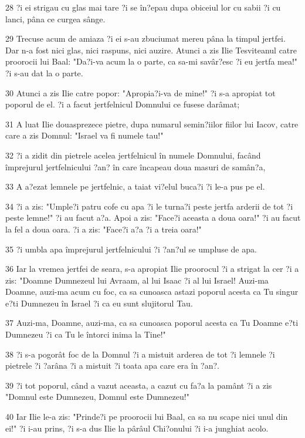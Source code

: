 \par 28 ?i ei strigau cu glas mai tare ?i se în?epau dupa obiceiul lor cu sabii ?i cu lanci, pâna ce curgea sânge.
\par 29 Trecuse acum de amiaza ?i ei s-au zbuciumat mereu pâna la timpul jertfei. Dar n-a fost nici glas, nici raspuns, nici auzire. Atunci a zis Ilie Tesviteanul catre proorocii lui Baal: "Da?i-va acum la o parte, ca sa-mi savâr?esc ?i eu jertfa mea!" ?i s-au dat la o parte.
\par 30 Atunci a zis Ilie catre popor: "Apropia?i-va de mine!" ?i s-a apropiat tot poporul de el. ?i a facut jertfelnicul Domnului ce fusese darâmat;
\par 31 A luat Ilie douasprezece pietre, dupa numarul semin?iilor fiilor lui Iacov, catre care a zis Domnul: "Israel va fi numele tau!"
\par 32 ?i a zidit din pietrele acelea jertfelnicul în numele Domnului, facând împrejurul jertfelnicului ?an? în care încapeau doua masuri de samân?a,
\par 33 A a?ezat lemnele pe jertfelnic, a taiat vi?elul buca?i ?i le-a pus pe el.
\par 34 ?i a zis: "Umple?i patru cofe cu apa ?i le turna?i peste jertfa arderii de tot ?i peste lemne!" ?i au facut a?a. Apoi a zis: "Face?i aceasta a doua oara!" ?i au facut la fel a doua oara. ?i a zis: "Face?i a?a ?i a treia oara!"
\par 35 ?i umbla apa împrejurul jertfelnicului ?i ?an?ul se umpluse de apa.
\par 36 Iar la vremea jertfei de seara, s-a apropiat Ilie proorocul ?i a strigat la cer ?i a zis: "Doamne Dumnezeul lui Avraam, al lui Isaac ?i al lui Israel! Auzi-ma Doamne, auzi-ma acum cu foc, ca sa cunoasca astazi poporul acesta ca Tu singur e?ti Dumnezeu în Israel ?i ca eu sunt slujitorul Tau.
\par 37 Auzi-ma, Doamne, auzi-ma, ca sa cunoasca poporul acesta ca Tu Doamne e?ti Dumnezeu ?i ca Tu le întorci inima la Tine!"
\par 38 ?i s-a pogorât foc de la Domnul ?i a mistuit arderea de tot ?i lemnele ?i pietrele ?i ?arâna ?i a mistuit ?i toata apa care era în ?an?.
\par 39 ?i tot poporul, când a vazut aceasta, a cazut cu fa?a la pamânt ?i a zis  "Domnul este Dumnezeu, Domnul este Dumnezeu!"
\par 40 Iar Ilie le-a zis: "Prinde?i pe proorocii lui Baal, ca sa nu scape nici unul din ei!" ?i i-au prins, ?i s-a dus Ilie la pârâul Chi?onului ?i i-a junghiat acolo.
